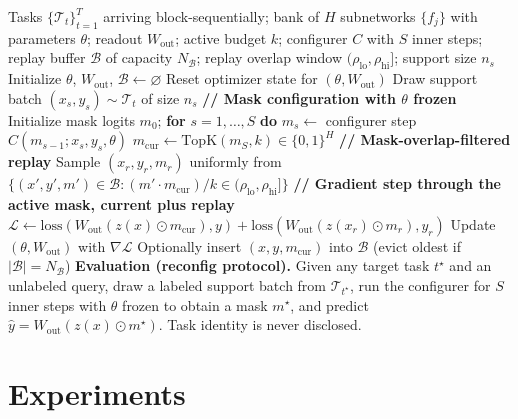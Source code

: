\documentclass[11pt]{article}
\begin{document}
\begin{algorithm}[t]
\caption{Functional Task Networks: training and reconfig evaluation}
\label{alg:ftn}
\begin{algorithmic}[1]
\REQUIRE Tasks $\{\mathcal{T}_t\}_{t=1}^{T}$ arriving block-sequentially; bank of $H$ subnetworks $\{f_j\}$ with parameters $\theta$; readout $W_\mathrm{out}$; active budget $k$; configurer $C$ with $S$ inner steps; replay buffer $\mathcal{B}$ of capacity $N_\mathcal{B}$; replay overlap window $(\rho_\mathrm{lo}, \rho_\mathrm{hi}]$; support size $n_s$
\STATE Initialize $\theta$, $W_\mathrm{out}$, $\mathcal{B}\leftarrow\varnothing$
    \STATE Reset optimizer state for $(\theta, W_\mathrm{out})$
        \STATE Draw support batch $(x_s, y_s)\sim \mathcal{T}_t$ of size $n_s$
        \STATE \textbf{// Mask configuration with $\theta$ frozen}
        \STATE Initialize mask logits $m_0$; \textbf{for} $s=1,\dots,S$ \textbf{do} $m_s \leftarrow$ configurer step $C(m_{s-1}; x_s, y_s, \theta)$
        \STATE $m_\mathrm{cur} \leftarrow \mathrm{TopK}(m_S, k) \in \{0,1\}^H$
        \STATE \textbf{// Mask-overlap-filtered replay}
        \STATE Sample $(x_r, y_r, m_r)$ uniformly from $\{(x', y', m')\in\mathcal{B} : (m'\!\cdot m_\mathrm{cur})/k \in (\rho_\mathrm{lo}, \rho_\mathrm{hi}]\}$
        \STATE \textbf{// Gradient step through the active mask, current plus replay}
        \STATE $\mathcal{L} \leftarrow \mathrm{loss}(W_\mathrm{out}(z(x)\odot m_\mathrm{cur}), y) + \mathrm{loss}(W_\mathrm{out}(z(x_r)\odot m_r), y_r)$
        \STATE Update $(\theta, W_\mathrm{out})$ with $\nabla \mathcal{L}$
        \STATE Optionally insert $(x, y, m_\mathrm{cur})$ into $\mathcal{B}$ (evict oldest if $|\mathcal{B}|=N_\mathcal{B}$)
    \ENDFOR
\ENDFOR
\STATE \textbf{Evaluation (reconfig protocol).} Given any target task $t^\star$ and an unlabeled query, draw a labeled support batch from $\mathcal{T}_{t^\star}$, run the configurer for $S$ inner steps with $\theta$ frozen to obtain a mask $m^\star$, and predict $\hat{y} = W_\mathrm{out}(z(x)\odot m^\star)$. Task identity is never disclosed.
\end{algorithmic}
\end{algorithm}

\section{Experiments}\label{sec:experiments}
\end{document}
